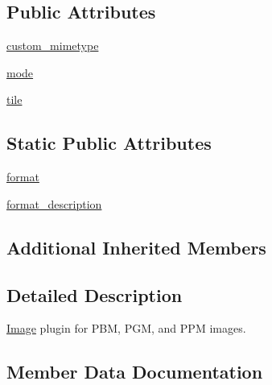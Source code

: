 \subsection*{Public Attributes}
\begin{DoxyCompactItemize}
\item 
\hyperlink{classPIL_1_1PpmImagePlugin_1_1PpmImageFile_a7f2a64df09c6d64825086de21b8519d4}{custom\+\_\+mimetype}
\item 
\hyperlink{classPIL_1_1PpmImagePlugin_1_1PpmImageFile_a54bbff8ca7db6eaf2136e03eebeaa9b7}{mode}
\item 
\hyperlink{classPIL_1_1PpmImagePlugin_1_1PpmImageFile_aca198d609afa86c5146c42fc9ed1e6ac}{tile}
\end{DoxyCompactItemize}
\subsection*{Static Public Attributes}
\begin{DoxyCompactItemize}
\item 
\hyperlink{classPIL_1_1PpmImagePlugin_1_1PpmImageFile_a366c06bd5cc3bbf0281371de764f08bd}{format}
\item 
\hyperlink{classPIL_1_1PpmImagePlugin_1_1PpmImageFile_aef614fccabecce3fa8a0e8d76b9fd7d3}{format\+\_\+description}
\end{DoxyCompactItemize}
\subsection*{Additional Inherited Members}


\subsection{Detailed Description}
\hyperlink{namespacePIL_1_1Image}{Image} plugin for P\+BM, P\+GM, and P\+PM images. 



\subsection{Member Data Documentation}
\mbox{\label{classPIL_1_1PpmImagePlugin_1_1PpmImageFile_a7f2a64df09c6d64825086de21b8519d4}} 
